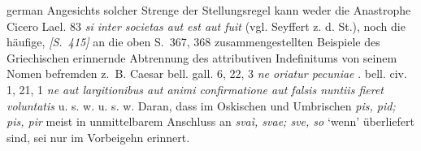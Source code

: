 \begin{otherlanguage*}{german}
Angesichts solcher Strenge der Stellungsregel kann weder die Anastrophe Cicero Lael. 83 \emph{si  inter societas aut est aut fuit} (vgl. Seyffert z. d. St.), noch die häufige, \hypertarget{p415}{\emph{[S.~415]}}\label{p415} an die oben S.~367, 368 zusammengestellten Beispiele des Griechischen erinnernde Abtrennung des attributiven Indefinitums von seinem Nomen befremden z.~B. Caesar bell. gall. 6, 22, 3 \emph{ne  oriatur pecuniae }. bell. civ. 1, 21, 1 \emph{ne  aut largitionibus aut animi confirmatione aut falsis nuntiis  fieret voluntatis} u. s. w. u. s. w. Daran, dass im Oskischen und Umbrischen \emph{pis, pid; pis, pir} meist in unmittelbarem Anschluss an \emph{svaì, svae; sve, so} ‘wenn’ überliefert sind, sei nur im Vorbeigehn erinnert.


\end{otherlanguage*}
